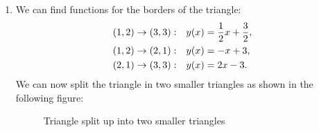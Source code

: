 \documentclass{exercise}
\begin{document}
	\begin{enumerate}
		\item We can find functions for the borders of the triangle:
		\begin{align*}
			\parentheses*{1, 2} \to \parentheses*{3, 3}:& \quad y\parentheses*{x} = \frac{1}{2}x + \frac{3}{2},\\
			\parentheses*{1, 2} \to \parentheses*{2, 1}:& \quad y\parentheses*{x} = -x + 3,\\
			\parentheses*{2, 1} \to \parentheses*{3, 3}:& \quad y\parentheses*{x} = 2x - 3.
		\end{align*}
		We can now split the triangle in two smaller triangles as shown in the following figure:
		\begin{figure}[h]
			\centering
			\caption{Triangle split up into two smaller triangles}
			\label{fig:1-2}
		\end{figure}


\end{enumerate}
\end{document}
